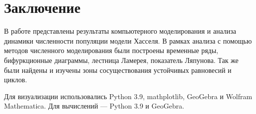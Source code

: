 \section{Заключение}

    В работе представлены результаты компьютерного моделирования и анализа динамики численности популяции модели Хасселя. В рамках анализа с помощью методов численного моделирования были построены временные ряды, бифуркционные диаграммы, лестница Ламерея, показатель Ляпунова. Так же были найдены и изучены зоны сосуществования устойчивых равновесий и циклов.

    Для визуализации использовались Python 3.9, mathplotlib, GeoGebra и Wolfram Mathematica. Для вычислений --- Python 3.9 и GeoGebra.